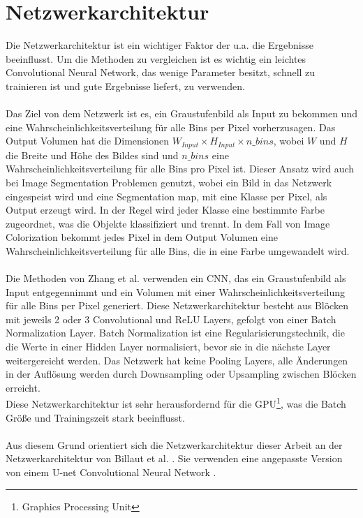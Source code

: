\section{Netzwerkarchitektur}
Die Netzwerkarchitektur ist ein wichtiger Faktor der u.a. die Ergebnisse beeinflusst. Um die Methoden zu vergleichen ist es wichtig ein
leichtes Convolutional Neural Network, das wenige Parameter besitzt, schnell zu trainieren ist und gute Ergebnisse liefert, zu verwenden.
\\
\\
Das Ziel von dem Netzwerk ist es, ein Graustufenbild als Input zu bekommen und eine Wahrscheinlichkeitsverteilung für alle Bins per Pixel vorherzusagen.
Das Output Volumen hat die Dimensionen $ W_{Input} \times H_{Input} \times n\_bins $, wobei $W$ und $H$ die Breite und Höhe des Bildes sind und
$n\_bins$ eine Wahrscheinlichkeitsverteilung für alle Bins pro Pixel ist. Dieser Ansatz wird auch bei Image Segmentation Problemen genutzt, wobei ein Bild
in das Netzwerk eingespeist wird und eine Segmentation map, mit eine Klasse per Pixel, als Output erzeugt wird. In der Regel wird jeder Klasse eine
bestimmte Farbe zugeordnet, was die Objekte klassifiziert und trennt. In dem Fall von Image Colorization bekommt jedes Pixel in dem Output Volumen
eine Wahrscheinlichkeitsverteilung für alle Bins, die in eine Farbe umgewandelt wird.
\\
\\
Die Methoden von Zhang et al. \cite{zhang2016colorful} verwenden ein \gls{CNN}, das ein Graustufenbild als Input entgegennimmt und ein Volumen mit
einer Wahrscheinlichkeitsverteilung für alle Bins per Pixel generiert. Diese Netzwerkarchitektur besteht aus Blöcken mit jeweils 2 oder 3 Convolutional
und ReLU Layers, gefolgt von einer Batch Normalization Layer. Batch Normalization ist eine Regularisierungstechnik, die die Werte in einer Hidden Layer
normalisiert, bevor sie in die nächste Layer weitergereicht werden. Das Netzwerk hat keine Pooling Layers, alle Änderungen in der Auflösung werden durch
Downsampling oder Upsampling zwischen Blöcken erreicht.
\\
Diese Netzwerkarchitektur ist sehr herausfordernd für die GPU\footnote{Graphics Processing Unit}, was die Batch Größe und Trainingszeit stark beeinflusst.
\\
\\
Aus diesem Grund orientiert sich die Netzwerkarchitektur dieser Arbeit an der Netzwerkarchitektur von Billaut et al. \cite{billaut2018colorunet}.
Sie verwenden eine angepasste Version von einem U-net Convolutional Neural Network \cite{ronneberger2015unet}.


